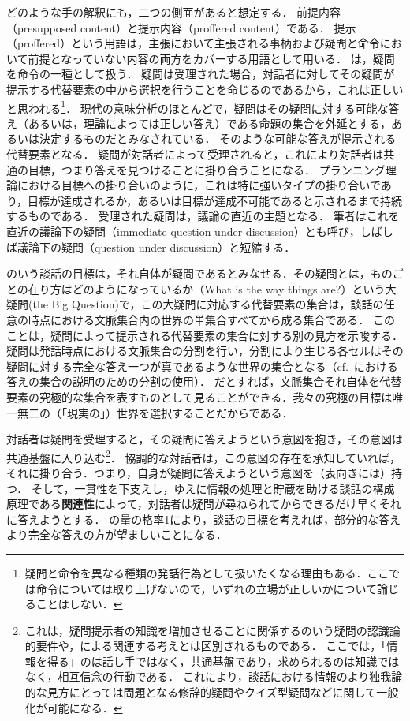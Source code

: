 \documentclass{goken}
\newcommand{\term}[2]{\textsf{#1}（#2）}
\newcommand{\ori}[1]{\noindent\textcolor[gray]{0.7}{\fontsize{8pt}{8pt}\selectfont{\textsf{(p.~#1)}}} }
\begin{document}
どのような手の解釈にも，二つの側面があると想定する．
\term{前提内容}{presupposed content}と\term{提示内容}{proffered content}である．
\term{提示}{proffered}という用語は，主張において主張される事柄および疑問と命令において前提となっていない内容の両方をカバーする用語として用いる．
\citet{Lewis1979}は，疑問を命令の一種として扱う．
疑問は受理された場合，対話者に対してその疑問が提示する代替要素の中から選択を行うことを命じるのであるから，これは正しいと思われる\footnote{疑問と命令を異なる種類の発話行為として扱いたくなる理由もある．ここでは命令については取り上げないので，いずれの立場が正しいかについて論じることはしない．}．
現代の意味分析のほとんどで，疑問はその疑問に対する可能な答え（あるいは，理論によっては正しい答え）である命題の集合を外延とする，あるいは決定するものだとみなされている．
そのような可能な答えが提示される代替要素となる．
疑問が対話者によって受理されると，これにより対話者は共通の目標，つまり答えを見つけることに掛り合うことになる．
プランニング理論における目標への掛り合いのように，これは特に強いタイプの掛り合いであり，目標が達成されるか，あるいは目標が達成不可能であると示されるまで持続するものである．
受理された疑問は，議論の直近の主題となる．
筆者はこれを\term{直近の議論下の疑問}{immediate question under discussion}とも呼び，しばしば\term{議論下の疑問}{question under discussion}と短縮する．

\citeauthor{Stalnaker1978}のいう談話の目標は，それ自体が疑問であるとみなせる．その疑問とは，\term{ものごとの在り方はどのようになっているか}{What is the way things are?}という大疑問(the Big Question)で，この大疑問に対応する代替要素の集合は，談話の任意の時点における文脈集合内の世界の単集合すべてから成る集合である．
このことは，疑問によって提示される代替要素の集合に対する別の見方を示唆する．
疑問は発話時点における文脈集合の分割を行い，分割により生じる各セルはその疑問に対する完全な答え一つが真であるような世界の集合となる（cf.~\citealt{GroenendijkStokhof1984}における答えの集合の説明のための分割の使用）．
だとすれば，文脈集合それ自体を代替要素の究極的な集合を表すものとして見ることができる．我々の究極の目標は唯一無二の（「現実の」）世界を選択することだからである．

\ori{6}
対話者は疑問を受理すると，その疑問に答えようという意図を抱き，その意図は共通基盤に入り込む\footnote{これは，疑問提示者の知識を増加させることに関係する\citet{Carlson1982}のいう疑問の認識論的要件や，\citet{Ginzburg1994}による関連する考えとは区別されるものである．
ここでは，「情報を得る」のは話し手ではなく，共通基盤であり，求められるのは知識ではなく，相互信念の行動である．
これにより，談話における情報のより独我論的な見方にとっては問題となる修辞的疑問やクイズ型疑問などに関して一般化が可能になる．}．
協調的な対話者は，この意図の存在を承知していれば，それに掛り合う．つまり，自身が疑問に答えようという意図を（表向きには）持つ．
そして，一貫性を下支えし，ゆえに情報の処理と貯蔵を助ける談話の構成原理である\textbf{関連性}によって，対話者は疑問が尋ねられてからできるだけ早くそれに答えようとする．
\citeauthor{Grice1989}の量の格率1により，談話の目標を考えれば，部分的な答えより完全な答えの方が望ましいことになる．
\end{document}
